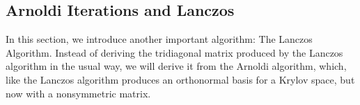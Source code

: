 \documentclass[]{article}
\theoremstyle{definition}
\begin{document}
    \subsection{Arnoldi Iterations and Lanczos}
        In this section, we introduce another important algorithm: The Lanczos Algorithm.  Instead of deriving the tridiagonal matrix produced by the Lanczos algorithm in the usual way, we will derive it from the Arnoldi algorithm, which, like the Lanczos algorithm produces an orthonormal basis for a Krylov space, but now with a nonsymmetric matrix.
\end{document}
